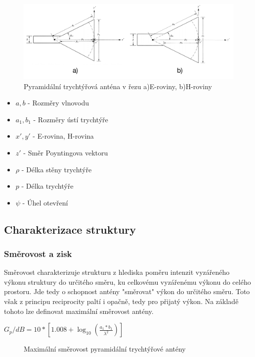 \begin{figure}[h]
\begin{center}
\includegraphics[width=15cm]{pics/hornEH}
\caption{Pyramidální trychtýřová anténa v řezu a)E-roviny, b)H-roviny}
\label{fig:hornEH}
\end{center}
\end{figure}
\begin{itemize}
\item $a, b$ - Rozměry vlnovodu
\item $a_1, b_1$ - Rozměry ústí trychtýře
\item $x', y'$ - E-rovina, H-rovina
\item $z'$ - Směr Poyntingova vektoru
\item $\rho$ - Délka stěny trychtýře
\item $p$ - Délka trychtýře
\item $\psi$ - Úhel otevření
\end{itemize}

\subsection{Charakterizace struktury}


\subsubsection{Směrovost a zisk}
Směrovost charakterizuje strukturu z hlediska poměru intenzit vyzářeného výkonu struktury do určitého směru, ku celkovému vyzářenému výkonu do celého prostoru. Jde tedy o schopnost antény "směrovat" výkon do určitého směru. Toto však z principu reciprocity paltí i opačně, tedy pro přijatý výkon. Na základě tohoto lze definovat maximální směrovost antény.

\renewcommand{\figurename}{}
\begin{center}
\LARGE{$G_p/dB = 10*[1.008+\log_{10}(\frac{a_1 * b_1}{\lambda^2})]$}
\begin{figure}[h]
\caption{Maximální směrovost pyramidální trychtýřové antény}
\label{fig:hornG}
\end{figure}
\end{center}
\renewcommand{\figurename}{Obrázek}

